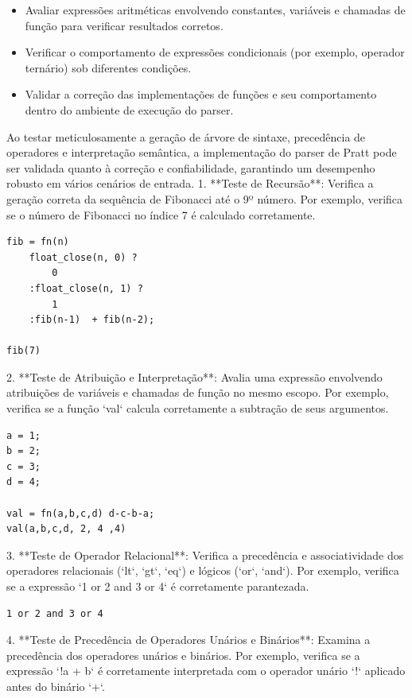 \documentclass[english, 
               brazil, 
               bsc] %
               {dcomp-abntex2}
\begin{document}
\begin{itemize}
    \item Avaliar expressões aritméticas envolvendo constantes, variáveis e chamadas de função para verificar resultados corretos.
    \item Verificar o comportamento de expressões condicionais (por exemplo, operador ternário) sob diferentes condições.
    \item Validar a correção das implementações de funções e seu comportamento dentro do ambiente de execução do parser.
\end{itemize}

Ao testar meticulosamente a geração de árvore de sintaxe, precedência de operadores e interpretação semântica, a implementação do parser de Pratt pode ser validada quanto à correção e confiabilidade, garantindo um desempenho robusto em vários cenários de entrada.
1. **Teste de Recursão**: Verifica a geração correta da sequência de Fibonacci até o 9º número. Por exemplo, verifica se o número de Fibonacci no índice 7 é calculado corretamente.

\begin{verbatim}
fib = fn(n)  
    float_close(n, 0) ? 
        0
    :float_close(n, 1) ?
        1
    :fib(n-1)  + fib(n-2);

fib(7)
\end{verbatim}

2. **Teste de Atribuição e Interpretação**: Avalia uma expressão envolvendo atribuições de variáveis e chamadas de função no mesmo escopo. Por exemplo, verifica se a função `val` calcula corretamente a subtração de seus argumentos.

\begin{verbatim}
a = 1;
b = 2;
c = 3;
d = 4;

val = fn(a,b,c,d) d-c-b-a; 
val(a,b,c,d, 2, 4 ,4)
\end{verbatim}

3. **Teste de Operador Relacional**: Verifica a precedência e associatividade dos operadores relacionais (`lt`, `gt`, `eq`) e lógicos (`or`, `and`). Por exemplo, verifica se a expressão `1 or 2 and 3 or 4` é corretamente parantezada.

\begin{verbatim}
1 or 2 and 3 or 4
\end{verbatim}

4. **Teste de Precedência de Operadores Unários e Binários**: Examina a precedência dos operadores unários e binários. Por exemplo, verifica se a expressão `!a + b` é corretamente interpretada com o operador unário `!` aplicado antes do binário `+`.
\end{document}
